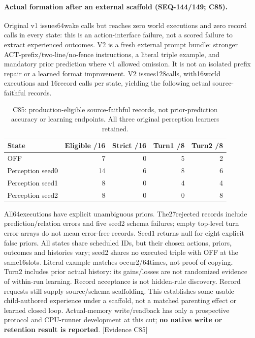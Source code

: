 \documentclass[11pt]{article}
\begin{document}
\paragraph{Actual formation after an external scaffold (SEQ-144/149; C85).}
Original v1 issues64wake calls but reaches zero world executions and zero record
calls in every state: this is an action-interface failure, not a scored failure
to extract experienced outcomes. V2 is a fresh external prompt bundle: stronger
ACT-prefix/two-line/no-fence instructions, a literal triple example, and mandatory
prior prediction where v1 allowed omission. It is not an isolated prefix repair
or a learned format improvement. V2 issues128calls, with16world executions and
16record calls per state, yielding the following actual source-faithful records.
\begin{table}[htbp]
\centering\small
\begin{tabular}{lrrrr}
\toprule
State & Eligible /16 & Strict /16 & Turn1 /8 & Turn2 /8 \\
\midrule
OFF & 7 & 0 & 5 & 2 \\
Perception seed0 & 14 & 6 & 8 & 6 \\
Perception seed1 & 8 & 0 & 4 & 4 \\
Perception seed2 & 8 & 0 & 0 & 8 \\
\bottomrule
\end{tabular}
\caption{C85: production-eligible source-faithful records, not prior-prediction
accuracy or learning endpoints. All three original perception learners retained.}
\label{tab:seq149-formation}
\end{table}
All64executions have explicit unambiguous priors. The27rejected records include
prediction/relation errors and five seed2 schema failures; empty top-level turn
error arrays do not mean error-free records. Seed1 returns null for eight explicit
false priors. All states share scheduled IDs, but their chosen actions, priors,
outcomes and histories vary; seed2 shares no executed triple with OFF at the
same16slots. Literal example matches occur2/64times, not proof of copying.
Turn2 includes prior actual history: its gains/losses are not randomized evidence
of within-run learning. Record acceptance is not hidden-rule discovery. Record requests still supply source/schema scaffolding. This
establishes some usable child-authored experience under a scaffold, not a
matched parenting effect or learned closed loop. Actual-memory write/readback
has only a prospective protocol and CPU-runner development at this cut;
\textbf{no native write or retention result is reported}. \textsf{[Evidence C85]}
\end{document}
